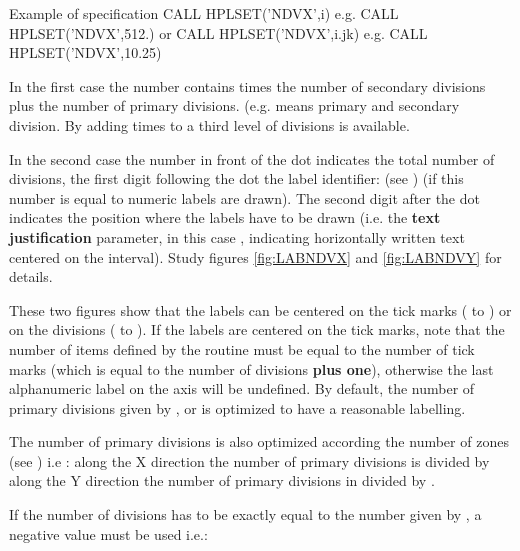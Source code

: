 \begin{UL}
      \begin{XMPt}{Example of  specification}
          CALL HPLSET('NDVX',i)      e.g.   CALL HPLSET('NDVX',512.)
       {\rm or}
          CALL HPLSET('NDVX',i.jk)   e.g.   CALL HPLSET('NDVX',10.25)
      \end{XMPt}
 
      In the first case the number  contains  times the number 
      of secondary divisions plus the number of primary divisions. (e.g. 
       means  primary and  secondary division. By adding
       times  to  a third level of divisions is 
      available. 

      In the second case the number in front of the dot  indicates the 
      total number of divisions, the first digit following the dot  the
      label identifier:  (see ) (if this number is 
      equal to  numeric labels are drawn). The second digit after the 
       dot indicates the position where the
       labels have to be drawn (i.e. the 
      {\bf text justification} parameter, in this case , indicating 
      horizontally written text centered on the interval). Study figures 
      \ref{fig:LABNDVX} and \ref{fig:LABNDVY} for details.
 
      These two figures show that the labels can be centered on the tick marks
      ( to ) or on the divisions ( to ). If the 
      labels are centered on the tick marks, note that the number of items 
      defined by the routine  must be equal to the number of tick
      marks (which is equal to the number of divisions {\bf plus one}),
      otherwise the last alphanumeric label on the axis will be undefined.
       By default, the number of primary divisions given by 
      ,  or 
       is optimized to have a reasonable labelling.

      The number of primary divisions is also optimized 
      according the number of zones (see ) i.e : 
      along the X direction the number of primary divisions is divided by 
       along the Y direction the number of primary 
      divisions in divided by .

      If the number of divisions has to be exactly equal to the number given by
      , a negative value must be used i.e.:
 

\end{UL}
